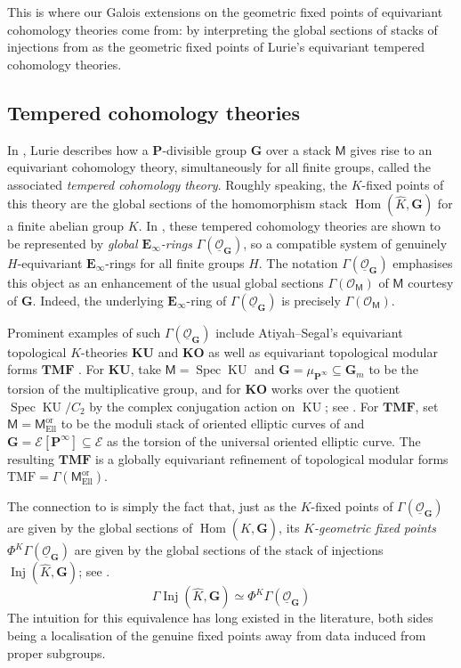 \documentclass[11pt, a4paper]{article}
\newcommand{\Ell}{\mathrm{Ell}}
\newcommand{\ori}{\mathrm{or}}
\DeclareMathOperator{\Spec}{Spec}
\newcommand{\1}{\mathbf{1}}
\DeclareMathOperator{\KU}{KU}
\newcommand{\gKU}{{\mathbf{KU}}}
\newcommand{\gKO}{{\mathbf{KO}}}
\newcommand{\gTMF}{{\mathbf{TMF}}}
\newcommand{\TMF}{\mathrm{TMF}}
\DeclareMathOperator{\Inj}{Inj}
\DeclareMathOperator{\Hom}{Hom}
\newcommand{\ul}[1]{\underline{#1}}
\newcommand{\dual}[1]{{\widehat{#1}}}
\newcommand{\E}{\mathbf{E}}
\newcommand{\calE}{\mathcal{E}}
\newcommand{\G}{\mathbf{G}}
\newcommand{\M}{\mathsf{M}}
\renewcommand{\O}{\mathcal{O}}
\renewcommand{\P}{\mathbf{P}}
\newcommand{\Ga}{\Gamma}
\theoremstyle{plain}
\theoremstyle{definition}
\theoremstyle{remark}\numberwithin{equation}{section}
\begin{document}
This is where our Galois extensions on the geometric fixed points of equivariant cohomology theories come from: by interpreting the global sections of stacks of injections from  as the geometric fixed points of Lurie's equivariant tempered cohomology theories.

\subsection*{Tempered cohomology theories}
In \cite{ec3}, Lurie describes how a $\P$-divisible group $\G$ over a stack $\M$ gives rise to an equivariant cohomology theory, simultaneously for all finite groups, called the associated \emph{tempered cohomology theory}. Roughly speaking, the $K$-fixed points of this theory are the global sections of the homomorphism stack $\Hom(\dual{K}, \G)$ for a finite abelian group $K$. In \cite{temperedglobal,gepner2024global2ringsgenuinerefinements}, these tempered cohomology theories are shown to be represented by \emph{global $\E_\infty$-rings} $\Ga(\ul{\O}_\G)$, so a compatible system of genuinely $H$-equivariant $\E_\infty$-rings for all finite groups $H$. The notation $\Ga(\ul{\O}_\G)$ emphasises this object as an enhancement of the usual global sections $\Ga(\O_\M)$ of $\M$ courtesy of $\G$. Indeed, the underlying $\E_\infty$-ring of $\Ga(\ul{\O}_\G)$ is precisely $\Ga(\O_\M)$.

Prominent examples of such $\Ga(\ul{\O}_\G)$ include Atiyah--Segal's \cite{equivktheory} equivariant topological $K$-theories $\gKU$ and $\gKO$ as well as equivariant topological modular forms $\gTMF$ \cite{davidandlennart}. For $\gKU$, take $\M=\Spec \KU$ and $\G = \mu_{\P^\infty} \subseteq \G_m$ to be the torsion of the multiplicative group, and for $\gKO$ works over the quotient $\Spec \KU / C_2$ by the complex conjugation action on $\KU$; see . For $\gTMF$, set $\M = \M_\Ell^\ori$ to be the moduli stack of oriented elliptic curves of \cite{ec2} and $\G=\calE[\P^\infty] \subseteq \calE$ as the torsion of the universal oriented elliptic curve. The resulting $\gTMF$ is a globally equivariant refinement of topological modular forms $\TMF = \Ga(\M_\Ell^\ori)$.

The connection to  is simply the fact that, just as the $K$-fixed points of $\Ga(\ul{\O}_\G)$ are given by the global sections of $\Hom(\dual{K}, \G)$, its \emph{$K$-geometric fixed points} $\Phi^K \Ga(\ul{\O}_\G)$ are given by the global sections of the stack of injections $\Inj(\dual{K}, \G)$; see \cite[Th.F]{temperedglobal}.
\[\Ga \Inj(\dual{K}, \G) \simeq \Phi^K \Ga(\ul{\O}_\G)\]
The intuition for this equivalence has long existed in the literature, both sides being a localisation of the genuine fixed points away from data induced from proper subgroups.
\end{document}
